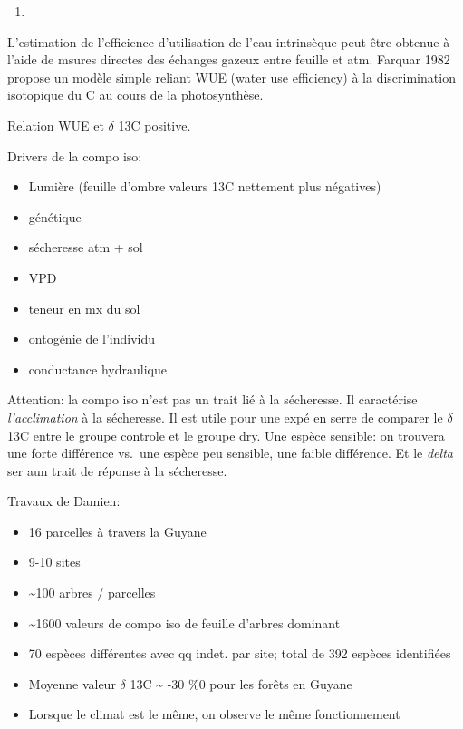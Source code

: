\documentclass[
]{book}
\providecommand{\tightlist}{%
  \setlength{\itemsep}{0pt}\setlength{\parskip}{0pt}}
\begin{document}
\begin{enumerate}
\def\labelenumi{(\arabic{enumi})}
\item
\end{enumerate}

L'estimation de l'efficience d'utilisation de l'eau intrinsèque peut être obtenue à l'aide de msures directes des échanges gazeux entre feuille et atm. Farquar 1982 propose un modèle simple reliant WUE (water use efficiency) à la discrimination isotopique du C au cours de la photosynthèse.

Relation WUE et \(\delta\) 13C positive.

Drivers de la compo iso:

\begin{itemize}
\tightlist
\item
  Lumière (feuille d'ombre valeurs 13C nettement plus négatives)
\item
  génétique
\item
  sécheresse atm + sol
\item
  VPD
\item
  teneur en mx du sol
\item
  ontogénie de l'individu
\item
  conductance hydraulique
\end{itemize}

Attention: la compo iso n'est pas un trait lié à la sécheresse. Il caractérise \emph{l'acclimation} à la sécheresse. Il est utile pour une expé en serre de comparer le \(\delta\) 13C entre le groupe controle et le groupe dry. Une espèce sensible: on trouvera une forte différence vs.~une espèce peu sensible, une faible différence. Et le \emph{delta} ser aun trait de réponse à la sécheresse.

Travaux de Damien:

\begin{itemize}
\tightlist
\item
  16 parcelles à travers la Guyane
\item
  9-10 sites\\
\item
  \textasciitilde100 arbres / parcelles
\item
  \textasciitilde1600 valeurs de compo iso de feuille d'arbres dominant
\item
  70 espèces différentes avec qq indet. par site; total de 392 espèces identifiées
\item
  Moyenne valeur \(\delta\) 13C \textasciitilde{} -30 \%0 pour les forêts en Guyane
\item
  Lorsque le climat est le même, on observe le même fonctionnement
\end{itemize}
\end{document}
